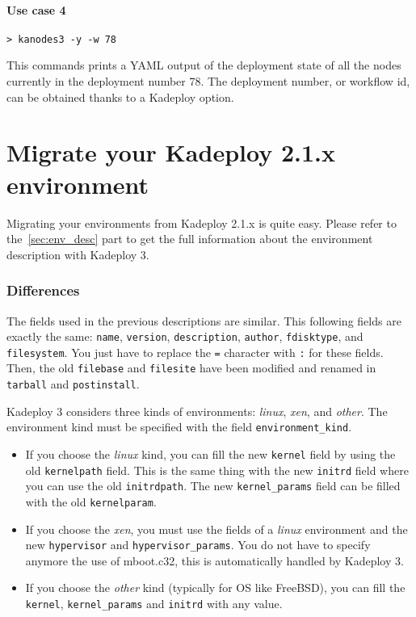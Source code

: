 \documentclass[a4wide,10pt,oneside]{book}
\begin{document}
\paragraph{Use case 4}
\begin{verbatim}
> kanodes3 -y -w 78
\end{verbatim}
This commands prints a YAML output of the deployment state of all the nodes currently in the deployment number 78. The deployment number, or workflow id, can be obtained thanks to a Kadeploy option.

\section{Migrate your Kadeploy 2.1.x environment}
Migrating your environments from Kadeploy 2.1.x is quite easy. Please refer to the~\ref{sec:env_desc} part to get the full information about the environment description with Kadeploy 3.

\subsubsection{Differences}
The fields used in the previous descriptions are similar. This following fields are exactly the same: \texttt{name}, \texttt{version}, \texttt{description}, \texttt{author}, \texttt{fdisktype}, and \texttt{filesystem}. You just have to replace the \texttt{=} character with \texttt{:} for these fields.
Then, the old \texttt{filebase} and \texttt{filesite} have been modified and renamed in \texttt{tarball} and \texttt{postinstall}.

Kadeploy 3 considers three kinds of environments: \textit{linux}, \textit{xen}, and \textit{other}. The environment kind must be specified with the field \texttt{environment\_kind}.
\begin{itemize}
\item If you choose the \textit{linux} kind, you can fill the new \texttt{kernel} field by using the old \texttt{kernelpath} field. This is the same thing with the new \texttt{initrd} field where you can use the old \texttt{initrdpath}. The new \texttt{kernel\_params} field can be filled with the old \texttt{kernelparam}.
\item If you choose the \textit{xen}, you must use the fields of a \textit{linux} environment and the new \texttt{hypervisor} and \texttt{hypervisor\_params}. You do not have to specify anymore the use of mboot.c32, this is automatically handled by Kadeploy 3.
\item If you choose the \textit{other} kind (typically for OS like FreeBSD), you can fill the \texttt{kernel}, \texttt{kernel\_params} and \texttt{initrd} with any value.
\end{itemize}
\end{document}
